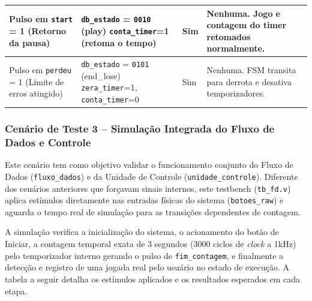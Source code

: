 \documentclass[a4paper,12pt,twoside]{article}
\begin{document}
\begin{table}[H]
\begin{tabular}{|>{\centering\arraybackslash}p{}|>{\centering\arraybackslash}p{}
  |>{\centering\arraybackslash}p{}|>{\centering\arraybackslash}p{}|}
  Pulso em \texttt{start} = 1 \newline (Retorno da pausa) &
  \texttt{db\_estado} = \texttt{0010} (play) \newline \texttt{conta\_timer}=1 (retoma o tempo) &
  Sim &
  Nenhuma. Jogo e contagem do timer retomados normalmente. \\ \hline


  Pulso em \texttt{perdeu} = 1 \newline (Limite de erros atingido) &
  \texttt{db\_estado} = \texttt{0101} (end\_lose) \newline \texttt{zera\_timer}=1, \texttt{conta\_timer}=0 &
  Sim &
  Nenhuma. FSM transita para derrota e desativa temporizadores. \\ \hline

  \end{tabular}
  \end{table}

  \subsubsection{Cenário de Teste 3 -- Simulação Integrada do Fluxo de Dados e
  Controle}\label{cenario-de-teste-x-simulacao-integrada}


  Este cenário tem como objetivo validar o funcionamento conjunto do Fluxo de Dados (\texttt{fluxo\_dados}) e
  da Unidade de Controle (\texttt{unidade\_controle}). Diferente dos cenários anteriores que forçavam sinais
  internos, este testbench (\texttt{tb\_fd.v}) aplica estímulos diretamente nas entradas físicas do sistema
  (\texttt{botoes\_raw}) e aguarda o tempo real de simulação para as transições dependentes de contagem.


  A simulação verifica a inicialização do sistema, o acionamento do botão de Iniciar, a contagem temporal
  exata de 3 segundos (3000 ciclos de \textit{clock} a 1kHz) pelo temporizador interno gerando o pulso de
  \texttt{fim\_contagem}, e finalmente a detecção e registro de uma jogada real pelo usuário no estado de
  execução. A tabela a seguir detalha os estímulos aplicados e os resultados esperados em cada etapa.
\end{document}
